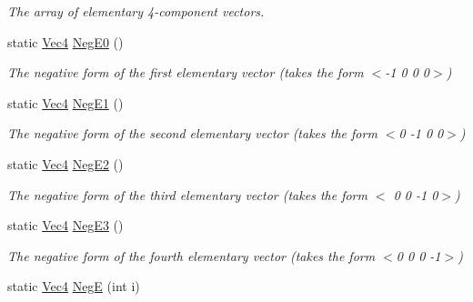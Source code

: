 \begin{DoxyCompactItemize}
\begin{DoxyCompactList}\small\item\em The array of elementary 4-\/component vectors. \end{DoxyCompactList}\item 
\hypertarget{classgfxmath_1_1_vec4_ae7e679c76f77752af8278adbc3000184}{}static \hyperlink{classgfxmath_1_1_vec4}{Vec4} \hyperlink{classgfxmath_1_1_vec4_ae7e679c76f77752af8278adbc3000184}{Neg\+E0} ()\label{classgfxmath_1_1_vec4_ae7e679c76f77752af8278adbc3000184}

\begin{DoxyCompactList}\small\item\em The negative form of the first elementary vector (takes the form $<$-\/1 0 0 0$>$) \end{DoxyCompactList}\item 
\hypertarget{classgfxmath_1_1_vec4_a2621b87b8c36463449af56ab020de208}{}static \hyperlink{classgfxmath_1_1_vec4}{Vec4} \hyperlink{classgfxmath_1_1_vec4_a2621b87b8c36463449af56ab020de208}{Neg\+E1} ()\label{classgfxmath_1_1_vec4_a2621b87b8c36463449af56ab020de208}

\begin{DoxyCompactList}\small\item\em The negative form of the second elementary vector (takes the form $<$0 -\/1 0 0$>$) \end{DoxyCompactList}\item 
\hypertarget{classgfxmath_1_1_vec4_ad27cfa3be5c0d7a531631cd7736d14c2}{}static \hyperlink{classgfxmath_1_1_vec4}{Vec4} \hyperlink{classgfxmath_1_1_vec4_ad27cfa3be5c0d7a531631cd7736d14c2}{Neg\+E2} ()\label{classgfxmath_1_1_vec4_ad27cfa3be5c0d7a531631cd7736d14c2}

\begin{DoxyCompactList}\small\item\em The negative form of the third elementary vector (takes the form $<$ 0 0 -\/1 0$>$) \end{DoxyCompactList}\item 
\hypertarget{classgfxmath_1_1_vec4_aba48145b1201b7e438bcdf84cd81620f}{}static \hyperlink{classgfxmath_1_1_vec4}{Vec4} \hyperlink{classgfxmath_1_1_vec4_aba48145b1201b7e438bcdf84cd81620f}{Neg\+E3} ()\label{classgfxmath_1_1_vec4_aba48145b1201b7e438bcdf84cd81620f}

\begin{DoxyCompactList}\small\item\em The negative form of the fourth elementary vector (takes the form $<$0 0 0 -\/1$>$) \end{DoxyCompactList}\item 
\hypertarget{classgfxmath_1_1_vec4_a8b1d7c4394f167b788391351c981d79b}{}static \hyperlink{classgfxmath_1_1_vec4}{Vec4} \hyperlink{classgfxmath_1_1_vec4_a8b1d7c4394f167b788391351c981d79b}{Neg\+E} (int i)\label{classgfxmath_1_1_vec4_a8b1d7c4394f167b788391351c981d79b}


\end{DoxyCompactItemize}
